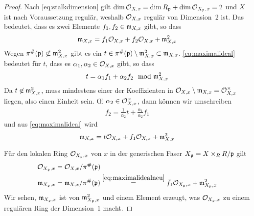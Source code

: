 \documentclass[german]{scrreprt}
\begin{document}
\begin{Lemma}
\begin{proof}
    Nach \ref{eq:stalkdimension} gilt
    $\dim\mathcal{O}_{X,x}=\dim R_{\mathfrak{p}}+\dim\mathcal{O}_{X_{\mathfrak{p}},x}=2$ und $X$ ist nach
    Voraussetzung regulär, weshalb $\mathcal{O}_{X,x}$ regulär von Dimension~2
    ist. Das bedeutet, dass es zwei Elemente $f_1, f_2\in\mathfrak{m}_{X,x}$
    gibt, so dass
    \begin{gather}\label{eq:maximalideal}
      \mathfrak{m}_{X,x} = f_1\mathcal{O}_{X,x} + f_2\mathcal{O}_{X,x} + \mathfrak{m}_{X,x}^2
    \end{gather}
    Wegen $\pi^\#(\mathfrak{p})\not\subset\mathfrak{m}_{X,x}^2$ gibt es ein
    $t\in\pi^\#(\mathfrak{p})\setminus\mathfrak{m}_{X,x}^2\subset\mathfrak{m}_{X,x}$.
    \ref{eq:maximalideal} bedeutet für $t$, dass es $\alpha_1,
    \alpha_2\in\mathcal{O}_{X,x}$ gibt, so dass
    \begin{gather*}
      t = \alpha_1 f_1 + \alpha_2 f_2 \mod {\mathfrak{m}}_{X,x}^2
    \end{gather*}
    Da $t\not\in\mathfrak{m}_{X,x}^2$, muss mindestens einer der Koeffizienten
    in $\mathcal{O}_{X,x}\setminus\mathfrak{m}_{X,x}=\mathcal{O}_{X,x}^\times$ liegen, also einen
    Einheit sein. \OE{} $\alpha_2\in\mathcal{O}_{X,x}^\times$, dann können wir
    umschreiben
    \begin{gather*}
      f_2 = \frac{1}{\alpha_2}t + \frac{\alpha_1}{\alpha_2}f_1 
    \end{gather*}
    und aus \eqref{eq:maximalideal} wird
    \begin{gather}\label{eq:maximalidealneu}
      \mathfrak{m}_{X,x} = t\mathcal{O}_{X,x} + f_1\mathcal{O}_{X,x} + \mathfrak{m}_{X,x}^2
    \end{gather}

    Für den lokalen Ring $\mathcal{O}_{X_{\mathfrak{p}},x}$ von $x$ in der generischen
    Faser $X_{\mathfrak{p}} = X\times_R R/\mathfrak{p}$ gilt
    \begin{align*}
      \mathcal{O}_{X_{\mathfrak{p}},x} &= \mathcal{O}_{X,x}/\pi^\#(\mathfrak{p})\\
      \mathfrak{m}_{X_{\mathfrak{p}},x} &= \mathfrak{m}_{X,x}/\pi^\#(\mathfrak{p})
                    \overset{\eqref{eq:maximalidealneu}}{=}
                    \bar f_1\mathcal{O}_{X_{\mathfrak{p}},x} + \mathfrak{m}_{X_{\mathfrak{p}},x}^2
    \end{align*}
    Wir sehen, $\mathfrak{m}_{X_{\mathfrak{p}},x}$ ist von $\mathfrak{m}_{X_{\mathfrak{p}},x}^2$ und einem Element
    erzeugt, was $\mathcal{O}_{X_{\mathfrak{p}},x}$ zu einem regulären Ring der Dimension~1
    macht.
  \end{proof}
\end{Lemma}

\end{document}
